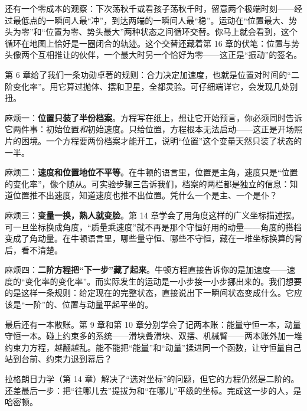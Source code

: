 还有一个零成本的观察：下次荡秋千或看孩子荡秋千时，留意两个极端时刻——经过最低点的一瞬间人最“冲”，到达两端的一瞬间人最“稳”。运动在“位置最大、势头为零”和“位置为零、势头最大”两种状态之间循环交替。你马上就会看到，这个循环在地图上恰好是一圈闭合的轨迹。这个交替还藏着第 16 章的伏笔：位置与势头像两个互相推让的伙伴，一个最大时另一个恰好为零——这正是“振动”的签名。


第 6 章给了我们一条功勋卓著的规则：合力决定加速度，也就是位置对时间的“二阶变化率”。用它算过抛体、摆和卫星，全都灵验。可仔细端详它，会发现几处别扭。

麻烦一：\textbf{位置只装了半份档案}。方程写在纸上，想让它开始预言，你必须同时告诉它两件事：初始位置\emph{和}初始速度。只给位置，方程根本无法启动——这正是开场照片的困境。一个方程要两份档案才能开工，说明“位置”这个变量天然只装了状态的一半。

麻烦二：\textbf{速度和位置地位不平等}。在牛顿的语言里，位置是主角，速度只是“位置的变化率”，像个随从。可实验步骤三告诉我们，档案的两栏都是独立的信息：知道位置推不出速度，知道速度也推不出位置。凭什么一个是主、一个是仆？

麻烦三：\textbf{变量一换，熟人就变脸}。第 14 章学会了用角度这样的广义坐标描述摆。可一旦坐标换成角度，“质量乘速度”就不再是那个守恒好用的动量——角度的搭档变成了角动量。在牛顿语言里，哪些量守恒、哪些不守恒，藏在一堆坐标换算的背后，看不清楚。

麻烦四：\textbf{二阶方程把“下一步”藏了起来}。牛顿方程直接告诉你的是加速度——速度的“变化率的变化率”。而实际发生的运动是一小步接一小步挪出来的。我们想要的是这样一条规则：给定现在的完整状态，直接说出下一瞬间状态变成什么。它应该是“一阶”的、位置与动量平起平坐的。

最后还有一本散账。第 9 章和第 10 章分别学会了记两本账：能量守恒一本，动量守恒一本。碰上约束多的系统——滑块叠滑块、双摆、机械臂——两本账外加一堆约束力方程，越翻越乱。能不能把“能量”和“动量”揉进同一个函数，让守恒量自己站到台前、约束力退到幕后？

拉格朗日力学（第 14 章）解决了“选对坐标”的问题，但它的方程仍然是二阶的。还差最后一步：把“往哪儿去”提拔为和“在哪儿”平级的坐标。完成这一步的人，是哈密顿。


